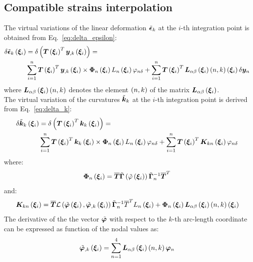 \subsection{Compatible strains interpolation}
The virtual variations of the linear deformation $\tilde{\bm{\epsilon} }_k $ at the $i$-th integration point is obtained from Eq.~\ref{eq:delta_epsilon}:
\begin{equation}
\begin{split}
\delta \tilde{\bm{\epsilon} }_k \left(  \bm{ \xi }_{ i }  \right) & = \delta \left(  \bm{T}\left(  \bm{ \xi }_{ i }  \right)^T \bm{y}_{,k} \left(  \bm{ \xi }_{ i }  \right)  \right) = \\
& \sum_{i=1}^n \bm{T}\left(  \bm{ \xi }_{ i }  \right)^T \bm{y}_{,k}\left(  \bm{ \xi }_{ i }  \right) \times \bm{\Phi}_{n} \left(  \bm{ \xi }_{ i }  \right) L_n \left(  \bm{ \xi }_{ i }  \right) \varphi_{n \delta} + \sum_{i=1}^n \bm{T}\left(  \bm{ \xi }_{ i }  \right)^T \bm{L}_{\alpha \beta} \left(  \bm{ \xi }_{ i }  \right) \left(  n, k  \right) \left(  \bm{ \xi }_{ i }  \right) \delta \bm{y}_{n}
\end{split}
\label{eq:delta_epsilon_i}
\end{equation}
where $\bm{L}_{\alpha \beta} \left(  \bm{ \xi }_{ i }  \right) \left(  n, k  \right)$ denotes the element $\left( n, k \right)$ of the matrix $\bm{L}_{\alpha \beta} \left(  \bm{ \xi }_{ i }  \right)$.\\
The  virtual variation of the curvatures $\tilde{\bm{k} }_k$ at the $i$-th integration point is derived from Eq.~\ref{eq:delta_k}:
\begin{equation}
\begin{split}
\delta \tilde{\bm{k} }_k \left(  \bm{ \xi }_{ i }  \right) & = \delta \left(  \bm{T}\left(  \bm{ \xi }_{ i }  \right)^T \bm{k}_k \left(  \bm{ \xi }_{ i }  \right) \right) =  \\
& \sum_{i=1}^n \bm{T}\left(  \bm{ \xi }_{ i }  \right)^T \bm{k}_k\left(  \bm{ \xi }_{ i }  \right) \times \bm{\Phi}_n\left(  \bm{ \xi }_{ i }  \right) L_n\left(  \bm{ \xi }_{ i }  \right) \varphi_{n \delta} + \sum_{i=1}^n \bm{T}\left(  \bm{ \xi }_{ i }  \right)^T \bm{K}_{kn}\left(  \bm{ \xi }_{ i }  \right) \varphi_{n \delta}
\end{split}
\label{eq:delta_k_i}
\end{equation}
where:
\begin{equation}
\bm{\Phi}_{n} \left(  \bm{ \xi }_{ i }  \right) = \overline{\bm{T}}  \tilde{ \bm{\Gamma} } \left(  \tilde{\varphi} \left(  \bm{ \xi }_{ i }  \right)  \right) \tilde{ \bm{\Gamma} }_n^{-1} \overline{\bm{T}}^T
\end{equation}
and:
\begin{equation}
\bm{K}_{kn} \left(  \bm{ \xi }_{ i }  \right) =
\overline{\bm{T}} \mathcal{L} \left(  \tilde{\bm{\varphi}}\left(  \bm{ \xi }_{ i }  \right), \tilde{\bm{\varphi}}_{,k}\left(  \bm{ \xi }_{ i }  \right)  \right) \tilde{ \bm{\Gamma} }_{n}^{-1} \overline{T}^T L_n\left(  \bm{ \xi }_{ i }  \right) + \bm{\Phi}_{n}\left(  \bm{ \xi }_{ i }  \right) \bm{L}_{\alpha \beta} \left(  \bm{ \xi }_{ i }  \right) \left(  n, k  \right) \left(  \bm{ \xi }_{ i }  \right)
\end{equation}
The derivative of the the vector $\tilde{\bm{\varphi}}$ with respect to the $k$-th arc-length coordinate can be expressed as function of the nodal values as:
\begin{equation}
\tilde{ \bm{ \varphi } }_{,k} \left(  \bm{ \xi }_{ i }  \right)  =
\sum_{n=1}^4 \bm{L}_{\alpha \beta} \left(  \bm{ \xi }_{ i }  \right) \left(  n, k  \right) \bm{\varphi}_{n}
\end{equation}
